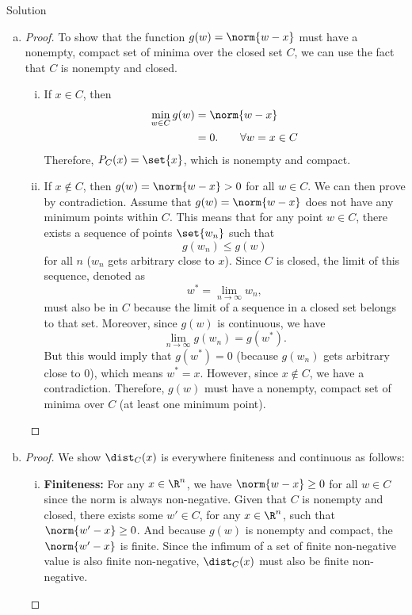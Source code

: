 \documentclass{article}
\theoremstyle{plain}
\theoremstyle{definition}
\theoremstyle{remark}
\begin{document}
\begin{solution}
    {Solution}
    \begin{enumerate}[(a)]
        \item {
            \begin{proof}
            To show that the function $g(w)=\norm{w-x}$ must have a nonempty, compact set of minima over the closed set $C$, we can use the fact that $C$ is nonempty and closed.
            \begin{enumerate}[(i)]
                \item If $x\in C$, then {
                    \begin{align*}
                        \min_{w\in C} g(w)
                        & =\norm{w-x} \\
                        &=0. \qquad \forall w=x\in C
                    \end{align*}
                }
                Therefore, $P_C(x)=\set{x}$, which is nonempty and compact.
                \item If $x\notin C$, then $g(w)=\norm{w-x}>0$ for all $w\in C$. We can then prove by contradiction. Assume that $g(w)=\norm{w-x}$ does not have any minimum points within $C$. This means that for any point $w\in C$, there exists a sequence of points $\set{w_n}$ such that
                \[g(w_n)\leq g(w)\]
                for all $n$ (\ie $w_n$ gets arbitrary close to $x$). Since $C$ is closed, the limit of this sequence, denoted as \[w^*=\lim_{n\rightarrow\infty}w_n,\] must also be in $C$ because the limit of a sequence in a closed set belongs to that set. Moreover, since $g(w)$ is continuous, we have \[\lim_{n\rightarrow\infty}g(w_n) = g(w^*).\]
                But this would imply that $g(w^*)=0$ (because $g(w_n)$ gets arbitrary close to $0$), which means $w^*=x$. However, since $x\notin C$, we have a contradiction. Therefore, $g(w)$ must have a nonempty, compact set of minima over $C$ (at least one minimum point).
            \end{enumerate}
        \end{proof}
        }
        \item {
            \begin{proof}
                We show $\dist_C(x)$ is everywhere finiteness and continuous as follows:
                \begin{enumerate}[(i)]
                    \item \textbf{Finiteness:} For any $x\in \R^n$, we have $\norm{w-x}\geq 0$ for all $w\in C$ since the norm is always non-negative. Given that $C$ is nonempty and closed, there exists some $w'\in C$, for any $x\in \R^n$, such that $\norm{w'-x}\geq 0$. And because $g(w)$ is nonempty and compact, the $\norm{w'-x}$ is finite. Since the infimum of a set of finite non-negative value is also finite non-negative, $\dist_C(x)$ must also be finite non-negative.

\end{enumerate}
\end{proof}}
\end{enumerate}
\end{solution}
\end{document}
